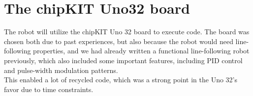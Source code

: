 



\section{The chipKIT Uno32 board}
The robot will utilize the chipKIT Uno 32 board to execute code. The board
was chosen both due to past experiences, but also because the robot would need
line-following properties, and we had already written a functional line-following robot
previously, which also included some important features, including PID control and 
pulse-width modulation patterns. \\
This enabled a lot of recycled code, which was a strong point
in the Uno 32's favor due to time constraints. \\

